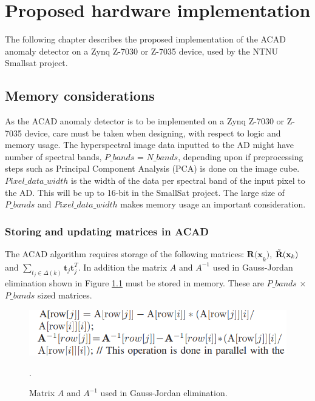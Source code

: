 \newpage
\chapter{Proposed hardware implementation}
\label{sec:implementation}
The following chapter describes the proposed implementation of the ACAD anomaly detector on a Zynq Z-7030 or Z-7035 device, used by the NTNU Smallsat project. \\

\section{Memory considerations}
\label{sec:memory_management}
    As the ACAD anomaly detector is to be implemented on a Zynq Z-7030 or Z-7035 device, care must be taken when designing, with respect to logic and memory usage. The hyperspectral image data inputted to the AD might have number of spectral bands, $P\_bands$ = $N\_bands$, depending upon if preprocessing steps such as Principal Component Analysis (PCA) is done on the image cube. $Pixel\_data\_width$ is the width of the data per spectral band of the input pixel to the AD. This will be up to 16-bit in the SmallSat project. The large size of $P\_bands$ and $Pixel\_data\_width$ makes memory usage an important consideration.

\subsection{Storing and updating matrices in ACAD }
\label{sec:mem_management_correlation_matrix}
The ACAD algorithm requires storage of the following matrices: $\textbf{R(x}_k)$, $\Tilde{\textbf{R}}(\textbf{x}_k)$ and $\sum_{t_j\in\Delta(k)}\textbf{t}_j\textbf{t}_j^T$. In addition the matrix $A$ and $A^{-1}$ used in Gauss-Jordan elimination shown in Figure \ref{fig:matrix_A_and} must be stored in memory. These are $P\_bands$ $\times$ $P\_bands$ sized matrices. 

\begin{figure}[H]
\centering                                                              \includegraphics[scale=0.5]{images/matrix_A_and_inv.PNG}
  \caption{Matrix $A$ and $A^{-1}$ used in Gauss-Jordan elimination.} 
  \label{fig:matrix_A_and}.
\end{figure}

